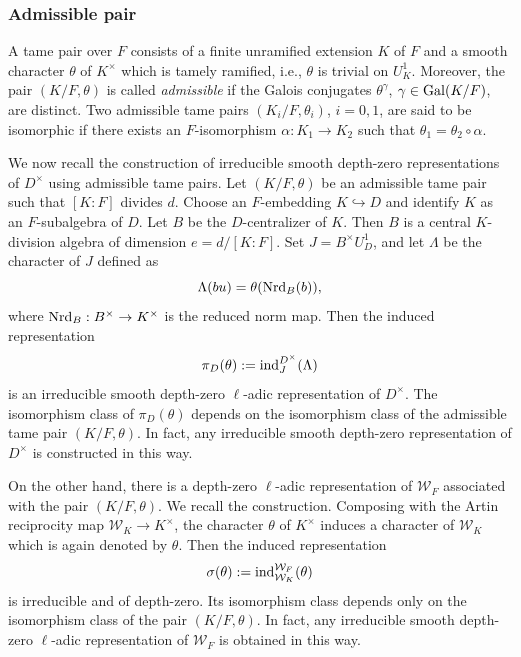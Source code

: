\documentclass[10pt, reqno]{amsart}
\theoremstyle{plain}
\numberwithin{equation}{section}
\begin{document}
\subsubsection{Admissible pair}\label{Adm_pair}
A tame pair over $F$ consists of a finite unramified extension $K$ of $F$ and a smooth character $\theta$ of $K^\times$ which is tamely ramified, i.e., $\theta$ is trivial on $U_K^1$. Moreover, the pair $(K/F,\theta)$ is called {\it admissible} if the Galois conjugates $\theta^\gamma$, $\gamma\in{\rm Gal}(K/F)$, are distinct. Two admissible tame pairs $(K_i/F,\theta_i)$, $i=0,1$, are said to be isomorphic if there exists an $F$-isomorphism $\alpha:K_1\rightarrow K_2$ such that $\theta_1=\theta_2\circ \alpha$.

We now recall the construction of irreducible smooth depth-zero representations of $D^\times$ using admissible tame pairs. Let $(K/F,\theta)$ be an admissible tame pair such that $[K:F]$ divides $d$. Choose an $F$-embedding $K\hookrightarrow D$ and identify $K$ as an $F$-subalgebra of $D$. Let $B$ be the $D$-centralizer of $K$. Then $B$ is a central $K$-division algebra of dimension $e=d/[K:F]$. Set $J=B^\times U_D^1$, and let $\Lambda$ be the character of $J$ defined as 
$$ \Lambda(bu) = \theta({\rm Nrd}_B(b)), $$
where ${\rm Nrd}_B:B^\times\rightarrow K^\times$ is the reduced norm map. Then the induced representation 
$$ \pi_D(\theta) := {\rm ind}_{J}^{D^\times}(\Lambda) $$
is an irreducible smooth depth-zero $\ell$-adic representation of $D^\times$. The isomorphism class of $\pi_D(\theta)$ depends on the isomorphism class of the admissible tame pair $(K/F,\theta)$. In fact, any irreducible smooth depth-zero representation of $D^\times$ is constructed in this way.

On the other hand, there is a depth-zero $\ell$-adic representation of $\mathcal{W}_F$ associated with the pair $(K/F,\theta)$. We recall the construction. Composing with the Artin reciprocity map $\mathcal{W}_K\rightarrow K^\times$, the character $\theta$ of $K^\times$ induces a character of $\mathcal{W}_K$ which is again denoted by $\theta$. Then the induced representation
$$ \sigma(\theta) := {\rm ind}_{\mathcal{W}_K}^{\mathcal{W}_F}(\theta) $$
is irreducible and of depth-zero. Its isomorphism class depends only on the isomorphism class of the pair $(K/F,\theta)$. In fact, any irreducible smooth depth-zero $\ell$-adic representation of $\mathcal{W}_F$ is obtained in this way.
\end{document}
